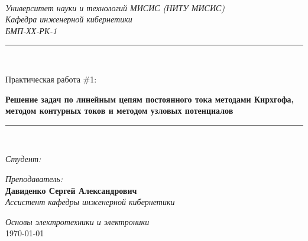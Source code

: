 \begin{titlepage}
    \newcommand{\HRule}{\rule{\linewidth}{0.5mm}}
    \\[0.6cm]
    \centering
    \textsl{\Large Университет науки и технологий МИСИС (НИТУ МИСИС)}\\[0.4cm]
    \textsl{\normalsize Кафедра инженерной кибернетики }\\[0.35cm]
    \textsl{\normalsize БМП-ХХ-РК-1 }\\[0.5cm]
    \makeatletter
    
    \HRule \\[0.3cm]
    \raggedright{{ \Large Практическая работа \#1:}\par}
    \centering
    { \Large }
    { \Large \textbf{Решение задач по линейным цепям постоянного тока методами Кирхгофа, методом контурных токов и методом узловых потенциалов} }\\[0.3cm]
    \HRule \\[1.0cm]
    \begin{minipage}[t]{0.45\textwidth}
    \begin{flushleft} \large
    \emph{Студент:}\\
    \@author 
    \end{flushleft}
    \end{minipage}
    \hfill \vrule width 0.5pt \hfill
    \begin{minipage}[t]{0.45\textwidth}
    \begin{flushright} \large
    \emph{Преподаватель:} \\
    \textup{\textbf{Давиденко Сергей Александрович}}  \\
    \textsl{Ассистент кафедры инженерной кибернетики}
    \end{flushright}
    \end{minipage}
    \vfill
    \makeatother
    {\large \emph{Основы электротехники и электроники}}\\[0.5cm]
    {\large \today}
    \end{titlepage}